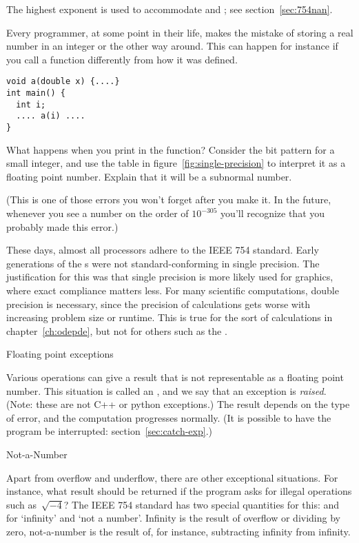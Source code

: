 The highest exponent is used to accommodate  and ;
see section~\ref{sec:754nan}.

\begin{exercise}
  Every programmer, at some point in their life, makes the mistake of
  storing a real number in an integer or the other way around. This
  can happen for instance if you call a function differently from how
  it was defined.
\begin{verbatim}
void a(double x) {....}
int main() {
  int i;
  .... a(i) ....
}
\end{verbatim}
What happens when you print  in the function? Consider the bit
pattern for a small integer, and use the table in
figure~\ref{fig:single-precision} to interpret it as a floating point
number. Explain that it will be a subnormal number.

(This
  is one of those errors you won't forget after you make it. In the
  future, whenever you see a number on the order of $10^{-305}$ you'll
  recognize that you probably made this error.)
\end{exercise}

These days, almost all processors adhere to the IEEE 754 standard.
Early generations of the 
s were not standard-conforming in single precision.
The justification
for this was that single precision is more likely used for graphics,
where exact compliance matters less. For many scientific computations,
double precision is necessary, since the precision of calculations
gets worse with increasing problem size or runtime. This is true for
the sort of calculations in chapter~\ref{ch:odepde}, but not for
others such as the .

 {Floating point exceptions}

Various operations can give a result that is not representable as a
floating point number. This situation is called an ,
and we say that an exception is \emph{raised}.
(Note: these are not C++ or python exceptions.)
The result depends on the type of error, and the computation
progresses normally. (It is possible to have the program
be interrupted: section~\ref{sec:catch-exp}.)

 {Not-a-Number}
\label{sec:754nan}

Apart from overflow and underflow, there are other
exceptional situations.
For instance,
what result should be returned if the program asks for
illegal operations such as~$\sqrt{-4}$? The IEEE 754 standard has two
special quantities for this:
 and~ for `infinity' and `not a number'.
Infinity is the result of overflow or
dividing by zero, not-a-number is the result of, for instance,
subtracting infinity from infinity.  

